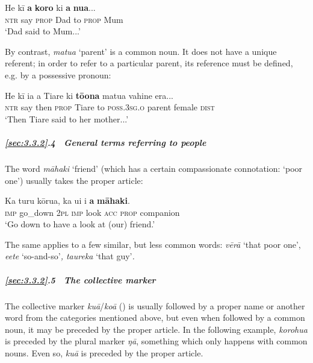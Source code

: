 \ea\label{ex:3.74}
\gll He kī \textbf{a} \textbf{koro} ki \textbf{a} \textbf{nua}... \\
\textsc{ntr} say \textsc{prop} Dad to \textsc{prop} Mum \\

\glt
‘Dad said to Mum...’ \textstyleExampleref{[R333.303]} 
\z

By contrast, \textit{matu{\ꞌ}a} ‘parent’ is a common noun. It does not have a unique referent; in order to refer to a particular parent, its reference must be defined, e.g. by a possessive pronoun:

\ea\label{ex:3.75}
\gll He kī ia a Tiare ki \textbf{tō{\ꞌ}ona} matu{\ꞌ}a vahine era... \\
\textsc{ntr} say then \textsc{prop} Tiare to \textsc{poss.3sg.o} parent female \textsc{dist} \\

\glt 
‘Then Tiare said to her mother...’ \textstyleExampleref{[R481.137]} 
\z

\subparagraph{\ref{sec:3.3.2}.4~ General terms referring to people} The word \textit{māhaki} ‘friend’ (which has a certain compassionate connotation: ‘poor one’) usually takes the proper article:

\ea\label{ex:3.76}
\gll Ka turu kōrua, ka u{\ꞌ}i i \textbf{a} \textbf{māhaki}. \\
\textsc{imp} go\_down \textsc{2pl} \textsc{imp} look \textsc{acc} \textsc{prop} companion \\

\glt
‘Go down to have a look at (our) friend.’ \textstyleExampleref{[Ley-2-05.011]}
\z

The same applies to a few similar, but less common words: \textit{vērā} ‘that poor one’, \textit{\mbox{{\ꞌ}e{\ꞌ}ete}} ‘so-and-so’\textit{, taureka} ‘that guy’\textit{.}

\subparagraph{\ref{sec:3.3.2}.5~ The collective marker} The collective marker \textit{kuā}/\textit{koā} () is usually followed by a proper name or another word from the categories mentioned above, but even when followed by a common noun, it may be preceded by the proper article. In the following example, \textit{korohu{\ꞌ}a} is preceded by the plural marker \textit{ŋā}, something which only happens with common nouns. Even so, \textit{kuā} is preceded by the proper article.

